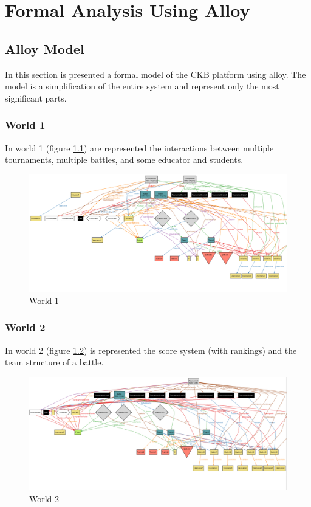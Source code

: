\chapter{Formal Analysis Using Alloy}

\section{Alloy Model}
In this section is presented a formal model of the CKB platform using alloy. The model is a simplification of the entire system and represent only the most significant parts.


\subsection*{World 1}
In world 1 (figure \ref{fig:world1}) are represented the interactions between multiple tournaments, multiple battles, and some educator and students.
\begin{figure}
        \centering
        \includegraphics[scale=0.4]{images/W1.png}
        \caption{World 1}
        \label{fig:world1}
\end{figure}

\subsection*{World 2}
In world 2 (figure \ref{fig:world2}) is represented the score system (with rankings) and the team structure of a battle.
\begin{figure}
        \centering
        \includegraphics[scale = 0.4]{images/W2.png}
        \caption{World 2}
        \label{fig:world2}
\end{figure}

